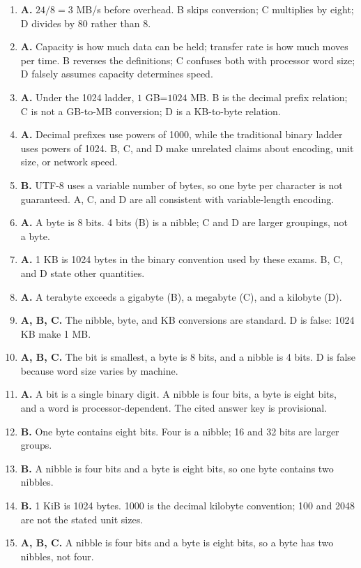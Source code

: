 \begin{enumerate}[label=\textbf{Q\arabic*.}, leftmargin=*]
  per byte, and two nibbles per byte. A, B, and C each omit a true statement.
\item \textbf{A.} $24/8=3$ MB/s before overhead. B skips conversion; C
  multiplies by eight; D divides by 80 rather than 8.
\item \textbf{A.} Capacity is how much data can be held; transfer rate is
  how much moves per time. B reverses the definitions; C confuses both with
  processor word size; D falsely assumes capacity determines speed.
\item \textbf{A.} Under the 1024 ladder, $1$ GB=$1024$ MB. B is the decimal
  prefix relation; C is not a GB-to-MB conversion; D is a KB-to-byte
  relation.
\item \textbf{A.} Decimal prefixes use powers of 1000, while the traditional
  binary ladder uses powers of 1024. B, C, and D make unrelated claims about
  encoding, unit size, or network speed.
\item \textbf{B.} UTF-8 uses a variable number of bytes, so one byte per
  character is not guaranteed. A, C, and D are all consistent with
  variable-length encoding.

\item \textbf{A.} A byte is 8 bits. 4 bits (B) is a nibble; C and D are larger groupings, not a byte.
\item \textbf{A.} 1 KB is 1024 bytes in the binary convention used by these exams. B, C, and D state other quantities.
\item \textbf{A.} A terabyte exceeds a gigabyte (B), a megabyte (C), and a kilobyte (D).
\item \textbf{A, B, C.} The nibble, byte, and KB conversions are standard. D is false: 1024 KB make 1 MB.
\item \textbf{A, B, C.} The bit is smallest, a byte is 8 bits, and a nibble is 4 bits. D is false because word size varies by machine.
\item \textbf{A.} A bit is a single binary digit. A nibble is four bits, a byte is eight bits, and a word is processor-dependent. The cited answer key is provisional.

\item \textbf{B.} One byte contains eight bits. Four is a nibble; 16 and 32 bits are larger groups.

\item \textbf{B.} A nibble is four bits and a byte is eight bits, so one byte contains two nibbles.

\item \textbf{B.} 1 KiB is 1024 bytes. 1000 is the decimal kilobyte convention; 100 and 2048 are not the stated unit sizes.

\item \textbf{A, B, C.} A nibble is four bits and a byte is eight bits, so a byte has two nibbles, not four.

\end{enumerate}
